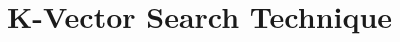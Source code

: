 \documentclass[../../main.tex]{subfiles}
\begin{document}
\section{K-Vector Search Technique}
\label{appendix:k-vector}
\thispagestyle{fancy}

\blindtext %
\end{document}
